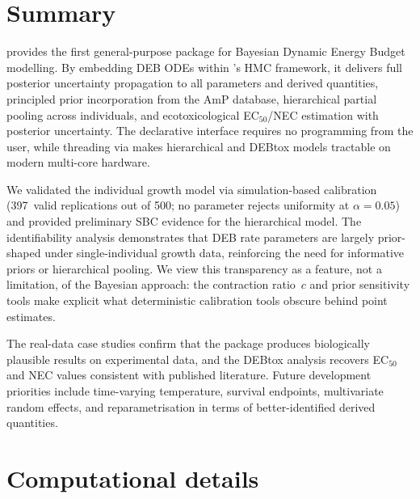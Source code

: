 \documentclass[article,shortnames]{jss}
\begin{document}
\section{Summary} \label{sec:summary}

 provides the first general-purpose 
package for Bayesian Dynamic Energy Budget modelling.  By embedding
DEB ODEs within 's HMC framework, it delivers full
posterior uncertainty propagation to all parameters and derived
quantities, principled prior incorporation from the AmP database,
hierarchical partial pooling across individuals, and ecotoxicological
EC$_{50}$/NEC estimation with posterior uncertainty.  The declarative
 interface requires no  programming from
the user, while threading via 
makes hierarchical and DEBtox models tractable on modern multi-core
hardware.

We validated the individual growth model via simulation-based
calibration (397~valid replications out of 500; no parameter
rejects uniformity at $\alpha = 0.05$) and provided preliminary
SBC evidence for the hierarchical model.  The identifiability
analysis demonstrates that DEB rate parameters are largely
prior-shaped under single-individual growth data,
reinforcing the need for informative priors or
hierarchical pooling.  We view
this transparency as a feature, not a limitation, of the Bayesian
approach: the contraction ratio~$c$ and prior sensitivity tools
make explicit what deterministic calibration tools obscure behind
point estimates.

The real-data case studies confirm that the package produces
biologically plausible results on experimental data, and the
DEBtox analysis recovers EC$_{50}$ and NEC values consistent
with published literature.  Future development priorities include
time-varying temperature, survival endpoints, multivariate random
effects, and reparametrisation in terms of better-identified
derived quantities.


\section*{Computational details}
\end{document}
